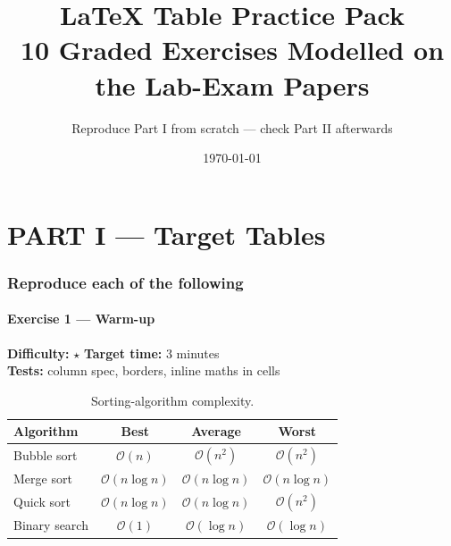 \documentclass[11pt]{article}
\title{\textbf{\LaTeX{} Table Practice Pack}\\[2pt]
  \large 10 Graded Exercises Modelled on the Lab-Exam Papers}
\author{Reproduce Part I from scratch --- check Part II afterwards}
\date{\today}
\newcommand{\exinfo}[3]{%
  \par\noindent
  \colorbox{RoyalBlue!12}{\parbox{0.97\textwidth}{\small
  \textbf{Difficulty:} #1 \qquad \textbf{Target time:} #2 \\
  \textbf{Tests:} #3}}\par\medskip}
\begin{document}
\maketitle

\begin{center}
\end{center}

\tableofcontents
\newpage

\part*{PART I --- Target Tables}
\section*{Reproduce each of the following}

\subsection*{Exercise 1 --- Warm-up}
\exinfo{$\star$}{3 minutes}{column spec, borders, inline maths in cells}

\begin{table}[H]
\centering
\caption{Sorting-algorithm complexity.}
\begin{tabular}{|l|c|c|c|}
\hline
\textbf{Algorithm} & \textbf{Best} & \textbf{Average} & \textbf{Worst} \\
\hline
Bubble sort    & $\mathcal{O}(n)$        & $\mathcal{O}(n^2)$      & $\mathcal{O}(n^2)$ \\
\hline
Merge sort     & $\mathcal{O}(n\log n)$  & $\mathcal{O}(n\log n)$  & $\mathcal{O}(n\log n)$ \\
\hline
Quick sort     & $\mathcal{O}(n\log n)$  & $\mathcal{O}(n\log n)$  & $\mathcal{O}(n^2)$ \\
\hline
Binary search  & $\mathcal{O}(1)$        & $\mathcal{O}(\log n)$   & $\mathcal{O}(\log n)$ \\
\hline
\end{tabular}
\end{table}
\end{document}
